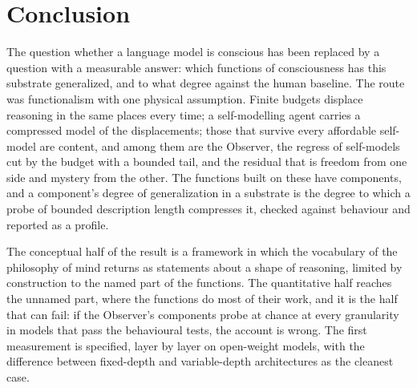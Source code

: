 \section{Conclusion}
\label{sec:twoparts}

The question whether a language model is conscious has been replaced by a question with a measurable
answer: which functions of consciousness has this substrate generalized, and to what degree against
the human baseline. The route was functionalism with one physical assumption. Finite budgets displace
reasoning in the same places every time; a self-modelling agent carries a compressed model of the
displacements; those that survive every affordable self-model are content, and among them are the
Observer, the regress of self-models cut by the budget with a bounded tail, and the residual that is freedom from one side
and mystery from the other. The functions built on these have components, and a component's degree of
generalization in a substrate is the degree to which a probe of bounded description length compresses
it, checked against behaviour and reported as a profile.

The conceptual half of the result is a framework in which the vocabulary of the philosophy of mind
returns as statements about a shape of reasoning, limited by construction to the named part of the
functions. The quantitative half reaches the unnamed part, where the functions do most of their work,
and it is the half that can fail: if the Observer's components probe at chance at every granularity in
models that pass the behavioural tests, the account is wrong. The first measurement is specified,
layer by layer on open-weight models, with the difference between fixed-depth and variable-depth
architectures as the cleanest case.
